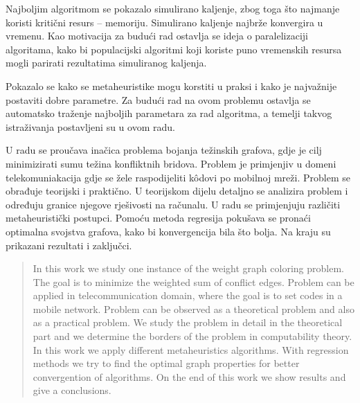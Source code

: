 \documentclass[times, utf8, diplomski, numeric]{fer}
\begin{document}
Najboljim algoritmom se pokazalo simulirano kaljenje, zbog toga što najmanje koristi kritični resurs -- memoriju. Simulirano kaljenje najbrže konvergira u vremenu. Kao motivacija za budući rad ostavlja se ideja o paralelizaciji algoritama, kako bi populacijski algoritmi koji koriste puno vremenskih resursa mogli parirati rezultatima simuliranog kaljenja.

Pokazalo se kako se metaheuristike mogu korstiti u praksi i kako je najvažnije postaviti dobre parametre. Za budući rad na ovom problemu ostavlja se automatsko traženje najboljih parametara za rad algoritma, a temelji takvog istraživanja postavljeni su u ovom radu.




\begin{sazetak}

U radu se proučava inačica problema bojanja težinskih grafova, gdje je cilj minimizirati sumu težina konfliktnih bridova. Problem je primjenjiv u domeni telekomuniakacija gdje se žele raspodijeliti k\^{o}dovi po mobilnoj mreži. Problem se obrađuje teorijski i praktično. U teorijskom dijelu detaljno se analizira problem i određuju granice njegove rješivosti na računalu. U radu se primjenjuju različiti metaheuristički postupci. Pomoću metoda regresija pokušava se pronaći optimalna svojstva grafova, kako bi konvergencija bila što bolja. Na kraju su prikazani rezultati i zaključci.

\end{sazetak}

\begin{abstract}

In this work we study one instance of the weight graph coloring problem. The goal is to minimize the weighted sum of conflict edges. Problem can be applied in telecommunication domain, where the goal is to set codes in a mobile network. Problem can be observed as a theoretical problem and also as a practical problem. We study the problem in detail in the theoretical part and we determine the borders of the problem in computability theory. In this work we apply different metaheuristics algorithms. With regression methods we try to find the optimal graph properties for better convergention of algorithms. On the end of this work we show results and give a conclusions.


\end{abstract}
\end{document}
